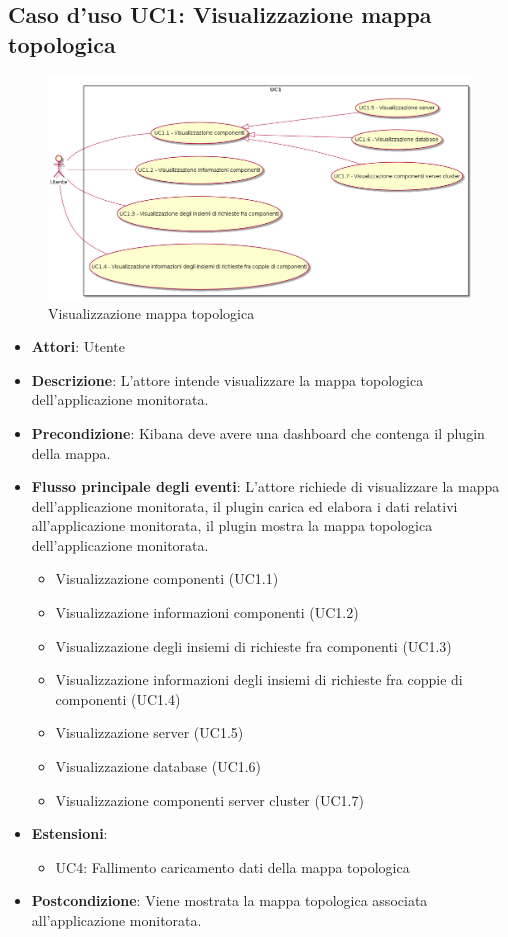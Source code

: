 \subsection{Caso d'uso UC1: Visualizzazione mappa topologica}
\begin{figure} [H]
	\centering
	\includegraphics[scale=0.40]{./UC/UC1.png}
	\caption{Visualizzazione mappa topologica}\label{}
\end{figure}
\begin{itemize}
	\item \textbf{Attori}: Utente
	\item \textbf{Descrizione}: L'attore intende visualizzare la mappa topologica dell'applicazione monitorata.
	\item \textbf{Precondizione}: Kibana deve avere una dashboard che contenga il plugin della mappa.
	\item \textbf{Flusso principale degli eventi}: L'attore richiede di visualizzare la mappa dell'applicazione monitorata, il plugin carica ed elabora i dati relativi all'applicazione monitorata, il plugin mostra la mappa topologica dell'applicazione monitorata.
	\begin{itemize}
		\item Visualizzazione componenti (UC1.1)
		\item Visualizzazione informazioni componenti (UC1.2)
		\item Visualizzazione degli insiemi di richieste fra componenti (UC1.3)
		\item Visualizzazione informazioni degli insiemi di richieste fra coppie di componenti (UC1.4)
		\item Visualizzazione server (UC1.5)
		\item Visualizzazione database (UC1.6)
		\item Visualizzazione componenti server cluster (UC1.7)
	\end{itemize}
	\item 	\textbf{Estensioni}:
	\begin{itemize}
		\item UC4: Fallimento caricamento dati della mappa topologica
	\end{itemize}
	\item \textbf{Postcondizione}: Viene mostrata la mappa topologica associata all'applicazione monitorata.
\end{itemize}
